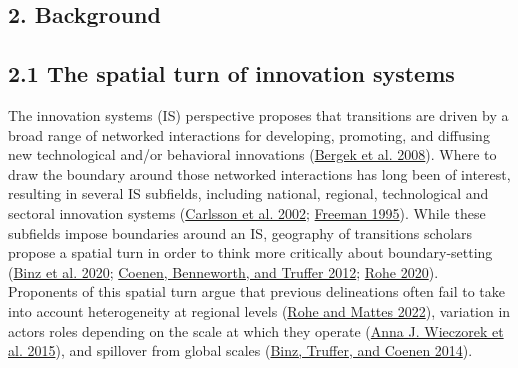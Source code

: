 \documentclass[twoside,12pt,final]{ucthesis-CA2012}
\begin{document}
\begin{ucmainmatter}
\hypertarget{background-1}{%
\section{2. Background}\label{background-1}}

\hypertarget{the-spatial-turn-of-innovation-systems}{%
\subsection{2.1 The spatial turn of innovation systems}\label{the-spatial-turn-of-innovation-systems}}

The innovation systems (IS) perspective proposes that transitions are
driven by a broad range of networked interactions for developing,
promoting, and diffusing new technological and/or behavioral innovations
(\protect\hyperlink{ref-Bergek_Jacobsson_Carlsson_Lindmark_Rickne_2008}{Bergek et al. 2008}).
Where to draw the boundary around those networked interactions has long
been of interest, resulting in several IS subfields, including national,
regional, technological and sectoral innovation systems
(\protect\hyperlink{ref-Carlsson_Jacobsson_Holmuxe9n_Rickne_2002}{Carlsson et al. 2002}; \protect\hyperlink{ref-Freeman_1995}{Freeman 1995}).
While these subfields impose boundaries around an IS, geography of
transitions scholars propose a spatial turn in order to think more
critically about boundary-setting
(\protect\hyperlink{ref-Binz_Coenen_Murphy_Truffer_2020}{Binz et al. 2020}; \protect\hyperlink{ref-Coenen_Benneworth_Truffer_2012}{Coenen, Benneworth, and Truffer 2012}; \protect\hyperlink{ref-Rohe_2020}{Rohe 2020}).
Proponents of this spatial turn argue that previous delineations often
fail to take into account heterogeneity at regional levels
(\protect\hyperlink{ref-Rohe_Mattes_2022}{Rohe and Mattes 2022}),
variation in actors\textquotesingle{} roles depending on the scale at which they operate
(\protect\hyperlink{ref-Wieczorek_Hekkert_Coenen_Harmsen_2015}{Anna J. Wieczorek et al. 2015}),
and spillover from global scales
(\protect\hyperlink{ref-Binz_Truffer_Coenen_2014}{Binz, Truffer, and Coenen 2014}).


\end{ucmainmatter}
\end{document}

